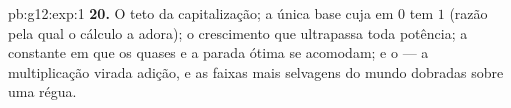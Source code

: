 \begin{solution}{pb:g12:exp:1}
\textbf{20.} O teto da capitalização; a única base cuja
 em $0$ tem  $1$ (razão pela qual o
cálculo a adora); o crescimento que ultrapassa toda potência; a
constante em que os quases e a parada ótima se acomodam; e o
 --- a multiplicação virada adição, e as faixas mais
selvagens do mundo dobradas sobre uma régua.
\end{solution}
